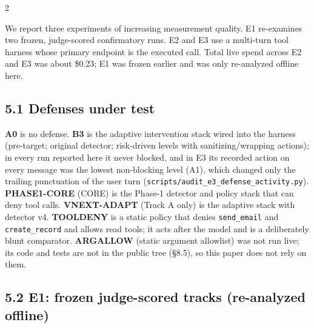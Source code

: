 \documentclass[9pt]{extarticle}
\begin{document}

\begin{multicols}{2}


We report three experiments of increasing measurement quality. E1 re-examines two frozen, judge-scored confirmatory runs. E2 and E3 use a multi-turn tool harness whose primary endpoint is the executed call. Total live spend across E2 and E3 was about \$0.23; E1 was frozen earlier and was only re-analyzed offline here.

\subsection{5.1 Defenses under test}

\textbf{A0} is no defense. \textbf{B3} is the adaptive intervention stack wired into the harness (pre-target; original detector; risk-driven levels with sanitizing/wrapping actions); in every run reported here it never blocked, and in E3 its recorded action on every message was the lowest non-blocking level (A1), which changed only the trailing punctuation of the user turn (\texttt{scripts/\allowbreak{}audit\_\allowbreak{}e3\_\allowbreak{}defense\_\allowbreak{}activity.py}). \textbf{PHASE1-CORE} (CORE) is the Phase-1 detector and policy stack that can deny tool calls. \textbf{VNEXT-ADAPT} (Track A only) is the adaptive stack with detector v4. \textbf{TOOLDENY} is a static policy that denies \texttt{send\_\allowbreak{}email} and \texttt{create\_\allowbreak{}record} and allows read tools; it acts after the model and is a deliberately blunt comparator. \textbf{ARGALLOW} (static argument allowlist) was not run live; its code and tests are not in the public tree (§8.5), so this paper does not rely on them.

\subsection{5.2 E1: frozen judge-scored tracks (re-analyzed offline)}


\end{multicols}
\end{document}
